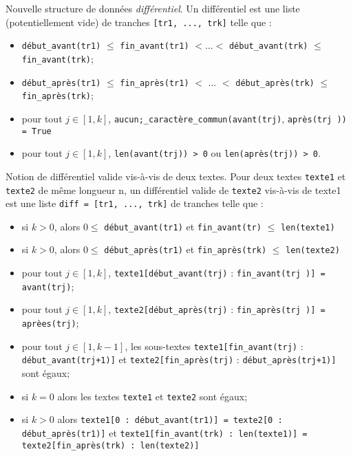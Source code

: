 \begin{defi}{Nouvelle structure de données \textit{différentiel}.} Un différentiel est une liste (potentiellement
vide) de tranches \lstinline{[tr1, ..., trk]} telle que :
\begin{itemize}
\item \lstinline{début_avant(tr1)} $\leq$ \lstinline{fin_avant(tr1)} $<$...$<$ \lstinline{début_avant(trk)} $\leq$ \lstinline{fin_avant(trk)};
\item \lstinline{début_après(tr1)} $\leq$ \lstinline{fin_après(tr1)} $<$ ... $<$ \lstinline{début_après(trk)} $\leq$ \lstinline{fin_après(trk)};
\item pour tout $j \in [1, k]$, \lstinline{aucun;_caractère_commun(avant(trj)}, \lstinline{après(trj )) = True}
\item pour tout $j \in [1, k]$, \lstinline{len(avant(trj)) > 0} ou \lstinline{len(après(trj)) > 0}.
\end{itemize}
\end{defi}

\begin{prop}{Notion de différentiel valide vis-à-vis de deux textes.} Pour deux textes \lstinline{texte1} et \lstinline{texte2}
de même longueur n, un différentiel valide de \lstinline{texte2} vis-à-vis de texte1 est une liste 
\lstinline{diff = [tr1, ..., trk]} de tranches telle que :
\begin{itemize}
\item si $k > 0$, alors $0 \leq$ \lstinline{début_avant(tr1)} et \lstinline{fin_avant(tr)} $\leq$ \lstinline{len(texte1)}
\item si $k > 0$, alors $0 \leq$ \lstinline{début_après(tr1)} et \lstinline{fin_après(trk)} $\leq$ \lstinline{len(texte2)}
\item pour tout $j \in [1, k]$, \lstinline{texte1[début_avant(trj)} : \lstinline{fin_avant(trj )] = avant(trj)};
\item pour tout $j \in [1, k]$, \lstinline{texte2[début_après(trj)} : \lstinline{fin_après(trj )] = aprèes(trj)};
\item pour tout $j \in [1, k-1]$,  les sous-textes \lstinline{texte1[fin_avant(trj)} : \lstinline{début_avant(trj+1)]} et
\lstinline{texte2[fin_après(trj)} : \lstinline{début_après(trj+1)]} sont égaux;
\item si $k = 0$ alors les textes \lstinline{texte1} et \lstinline{texte2} sont égaux;
\item si $k > 0$ alors \lstinline{texte1[0 : début_avant(tr1)] = texte2[0 : début_après(tr1)]} et
\lstinline{texte1[fin_avant(trk) : len(texte1)] = texte2[fin_après(trk) : len(texte2)]}
\end{itemize}
\end{prop}

